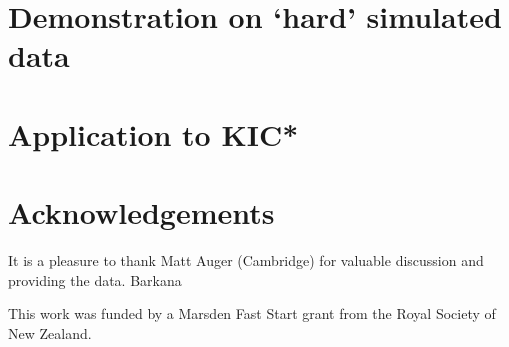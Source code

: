 \documentclass[a4paper,fleqn,usenatbib]{mnras}
\begin{document}
\section{Demonstration on `hard' simulated data}

\section{Application to KIC*}


\section*{Acknowledgements}
It is a pleasure to thank Matt Auger (Cambridge) for valuable discussion and
providing the data. Barkana

This work was funded by a Marsden Fast Start grant from the Royal Society of
New Zealand.












\bsp	%
\label{lastpage}
\end{document}
